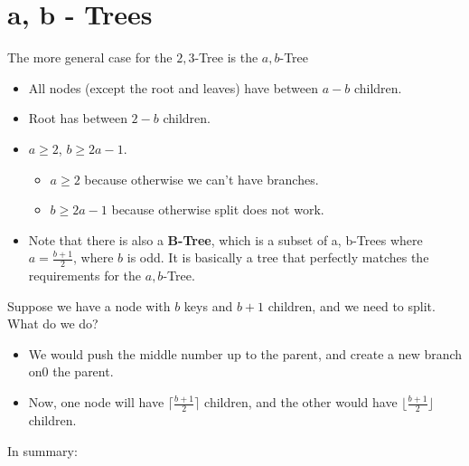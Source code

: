 \documentclass[10pt]{article}
\begin{document}
\section*{a, b - Trees}
The more general case for the $2, 3$-Tree is the $a, b$-Tree
\begin{itemize}
	\item All nodes (except the root and leaves) have between $a-b$ children.
	\item Root has between $2-b$ children.
	\item $a \geq 2$, $b \geq 2a - 1$.
	\begin{itemize}
        \item $a \geq 2$ because otherwise we can't have branches.
	    \item $b \geq 2a - 1$ because otherwise split does not work.
    \end{itemize}
    \item Note that there is also a \textbf{B-Tree}, which is a subset of a, b-Trees where $a = \frac{b + 1}{2}$, where $b$ is odd.  It is basically a tree that perfectly matches the requirements for the $a, b$-Tree.
\end{itemize}
Suppose we have a node with $b$ keys and $b + 1$ children, and we need to split.  What do we do?
\begin{itemize}
	\item We would push the middle number up to the parent, and create a new branch on0 the parent.
	\item Now, one node will have $\lceil\frac{b + 1}{2}\rceil$ children, and the other would have $\lfloor \frac{b + 1}{2} \rfloor$ children.
\end{itemize}
In summary:
\end{document}
